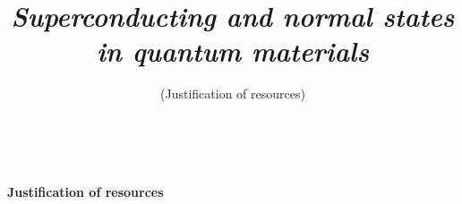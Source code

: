 \documentclass[prl,a4paper,11pt]{revtex4-2}
\begin{document}
\begin{singlespace}

\setlength{\columnsep}{1.9 em}

\setcounter{secnumdepth}{3}
\renewcommand \thesection{\arabic{section}}
\renewcommand \thesubsection{\arabic{subsection}}
\renewcommand \thesubsubsection{\arabic{subsection}.\arabic{subsubsection}}

\makeatletter
\renewcommand{\section}{%
  \@startsection
    {section}%
    {1}%
    {0mm}%
    {\baselineskip}%
    {0.2\baselineskip}%
    {\bf \normalsize \centering}%
}%

\renewcommand{\subsection}{%
  \@startsection
    {subsection}%
    {2}%
    {-0.9em}%
    {0.8\baselineskip}%
    {.2\baselineskip}%
    {\bf\normalsize}%
}%

\renewcommand{\subsubsection}{%
  \@startsection
    {subsubsection}%
    {3}%
    {-0.9em}%
    {.4\baselineskip}%
    {.2\baselineskip}%
    {\bf\normalsize}%
}%

\renewcommand\paragraph{%
  \@startsection
    {paragraph}%
    {4}%
    {0mm}%
    {0.2\baselineskip}%
    {-1em}%
    {\normalfont\normalsize\bf}%
}%

\makeatother
\title{\em Superconducting and normal states in quantum materials}

\author {%
\rm (Justification of resources)}

\onecolumngrid
\centerline{~}
\begin{center}
\vspace{-4em}
{\bf Justification of resources}
\vspace{0.5em}
\end{center}
\twocolumngrid


\end{singlespace}
\end{document}
